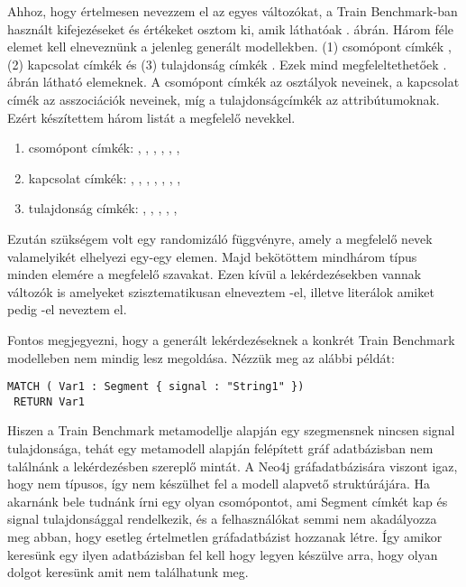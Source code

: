 Ahhoz, hogy értelmesen nevezzem el az egyes változókat, a Train Benchmark-ban használt kifejezéseket és értékeket osztom ki, amik láthatóak . ábrán. Három féle elemet kell elneveznünk a jelenleg generált modellekben. (1) csomópont címkék  , (2) kapcsolat címkék  és (3) tulajdonság címkék .
Ezek mind megfeleltethetőek . ábrán látható elemeknek. A csomópont címkék az osztályok neveinek, a kapcsolat címék az asszociációk neveinek, míg a tulajdonságcímkék az attribútumoknak. Ezért készítettem három listát a megfelelő nevekkel.
\begin{enumerate}
	\item csomópont címkék: , , , , , , 
	\item kapcsolat címkék: , , , , , , , 
	\item tulajdonság címkék: , , , , , 
	
\end{enumerate}
Ezután szükségem volt egy randomizáló függvényre, amely a megfelelő nevek valamelyikét elhelyezi egy-egy elemen.
Majd bekötöttem mindhárom típus minden elemére a megfelelő szavakat. Ezen kívül a lekérdezésekben vannak változók is amelyeket szisztematikusan elneveztem -el, illetve literálok amiket pedig -el neveztem el. 

Fontos megjegyezni, hogy a generált lekérdezéseknek a konkrét Train Benchmark modelleben nem mindig lesz megoldása. Nézzük meg az alábbi példát:
 \begin{lstlisting}[style=cyphersmall]
 MATCH ( Var1 : Segment { signal : "String1" })
 RETURN Var1 \end{lstlisting}
 \noindent Hiszen a Train Benchmark metamodellje alapján egy szegmensnek nincsen signal tulajdonsága, tehát egy metamodell alapján felépített gráf adatbázisban nem találnánk a lekérdezésben szereplő mintát. A Neo4j gráfadatbázisára viszont igaz, hogy nem típusos, így nem készülhet fel a modell alapvető struktúrájára. Ha akarnánk bele tudnánk írni egy olyan csomópontot, ami Segment címkét kap és signal tulajdonsággal rendelkezik, és a felhasználókat semmi nem akadályozza meg abban, hogy esetleg értelmetlen gráfadatbázist hozzanak létre. Így amikor keresünk egy ilyen adatbázisban fel kell hogy legyen készülve arra, hogy olyan dolgot keresünk amit nem találhatunk meg. 

